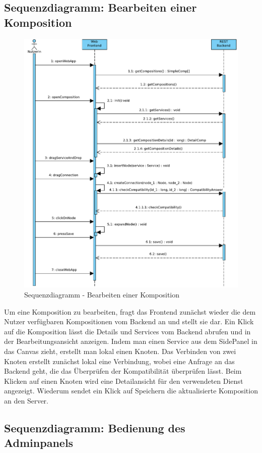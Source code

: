 \newpage
\subsection*{Sequenzdiagramm: Bearbeiten einer Komposition}

\begin{figure}[!h]
	\centering
	\includegraphics[width=.5\textwidth]{img/Diagramme/Sequenz/Frontend_editComp}			
	\caption{Sequenzdiagramm - Bearbeiten einer Komposition}
	\label{fig:sequenz-editComp}
\end{figure}
\noindent
Um eine Komposition zu bearbeiten, fragt das Frontend zunächst wieder die dem Nutzer verfügbaren Kompositionen vom Backend an und stellt sie dar. Ein Klick auf die Komposition lässt die Details und Services vom Backend abrufen und in der Bearbeitungsansicht anzeigen. Indem man einen Service aus dem SidePanel in das Canvas zieht, erstellt man lokal einen Knoten. Das Verbinden von zwei Knoten erstellt zunächst lokal eine Verbindung, wobei eine Anfrage an das Backend geht, die das Überprüfen der Kompatibilität überprüfen lässt. Beim Klicken auf einen Knoten wird eine Detailansicht für den verwendeten Dienst angezeigt. Wiederum sendet ein Klick auf Speichern die aktualisierte Komposition an den Server.

\newpage
\subsection*{Sequenzdiagramm: Bedienung des Adminpanels}

